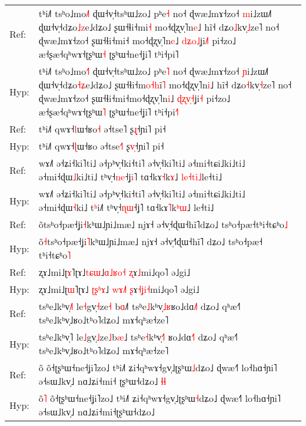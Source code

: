 \documentclass[10pt]{article}
\DeclareRobustCommand{\hl}[1]{{\textcolor{red}{#1}}}
\begin{document}
\begin{longtable}{ll}
\midrule 
Ref: & tʰi˩˥ tsʰo˩mo\hl{˩}˥ ɖɯ˧v̩˧tsʰɯ˩zo˩ pʰe\hl{˧} no˧ ɖwæ˩mɤ˧zo˧ \hl{m}i˩zɯ˩˥ ɖɯ˧v̩˧dʑo\hl{˩}\hl{z}e˩dʑo˩ ʂɯ˧ɬi˧mi\hl{˧} mo˧ɖʐv̩˥n\hl{e}˩ hĩ˧ dʑo\hl{˩}kv̩\hl{˩}ze˥ no˧ ɖwæ˩mɤ˧zo˧ ʂɯ˧ɬi˧mi˧\hl{ }mo˧ɖʐv̩˥n\hl{e}˩ \hl{d}\hl{ʑ}\hl{o}\hl{˩}ʝi\hl{˩}\hl{˥} pi˧zo˩ æ˧ʂæ˧qʰwɤ˧ʈʂʰɯ\hl{˧} ʈʂʰɯ˧ne˧ʝi˥ tʰi˧pi˥ \\ 
Hyp: & tʰi˩˥ tsʰo˩mo\hl{˧}˥ ɖɯ˧v̩˧tsʰɯ˩zo˩ pʰe\hl{˥} no˧ ɖwæ˩mɤ˧zo˧ \hl{ɲ}i˩zɯ˩˥ ɖɯ˧v̩˧dʑo\hl{˧}\hl{ʑ}e˩dʑo˩ ʂɯ˧ɬi˧m\hl{o}\hl{˧}\hl{h}i\hl{̃}\hl{˥} mo˧ɖʐv̩˥n\hl{i}˩ hĩ˧ dʑo\hl{˧}kv̩\hl{˧}ze˥ no˧ ɖwæ˩mɤ˧zo˧ ʂɯ˧ɬi˧mi˧mo˧ɖʐv̩˥n\hl{i}˩ \hl{ɖ}\hl{ʐ}\hl{v}\hl{̩}\hl{˧}ʝi\hl{˧} pi˧zo˩ æ˧ʂæ˧qʰwɤ˧ʈʂʰɯ\hl{˥} ʈʂʰɯ˧ne˧ʝi˥ tʰi˧pi\hl{˧}˥ \\ 
\midrule 
Ref: & tʰi˩˥ qwɤ˧\hl{l}ɯ˧ʁo\hl{˧} ə˧tse˥ ʂ\hl{ɻ}̩˧ɲi˥ pi˧ \\ 
Hyp: & tʰi˩˥ qwɤ˧\hl{ɭ}ɯ˧ʁo ə˧tse\hl{˧}˥ ʂ\hl{v}̩˧ɲi˥ pi˧ \\ 
\midrule 
Ref: & wɤ˩˥ ə˧ʑi˧ki˥ti˩ ə˧pʰv̩˧ki˧ti˥ ə˧v̩˧ki˥ti˩ ə˧mi˧tɕi˩ki˩ti˩ ə˧mi˧ɖɯ\hl{˩}ki˩ti˩ tʰv̩˧\hl{n}\hl{e}˧ʝ\hl{i}˥ tɑ˧kɤ\hl{˧}k\hl{ɤ}˩ \hl{l}\hl{e}\hl{˧}\hl{t}\hl{i}\hl{˩}le˧ti˩ \\ 
Hyp: & wɤ˩˥ ə˧ʑi˧ki˥ti˩ ə˧pʰv̩˧ki˧ti˥ ə˧v̩˧ki˥ti˩ ə˧mi˧tɕi˩ki˩ti˩ ə˧mi˧ɖɯ\hl{˧}ki˩\hl{ }t\hl{ʰ}i˩\hl{˥} tʰv̩˧\hl{ɳ}\hl{ɯ}˧ʝ˥ tɑ˧kɤ\hl{˥}k\hl{ʰ}\hl{ɯ}˩ le˧ti˩ \\ 
\midrule 
Ref: & õtsʰo˧pæ˧ʝi\hl{˧}kʰɯ˩ɲi˩mæ˩ njɤ˧ ə˧v̩˧ɖɯ˧hĩ˥dʑo˩ tsʰo˧pæ˧tʰi˧tɕʰo\hl{˩} \\ 
Hyp: & õ\hl{˧}tsʰo˧pæ˧ʝi\hl{˥}kʰɯ˩ɲi˩mæ˩ njɤ˧ ə˧v̩˧\hl{˥}ɖɯ˧hĩ˥\hl{ }dʑo˩ tsʰo˧pæ˧\hl{ }tʰi˧tɕʰo\hl{˥} \\ 
\midrule 
Ref: & ʐɤ˩mi˩ʈ\hl{ɤ}˥ʈɤ˩\hl{t}\hl{ɕ}\hl{ɯ}˩\hl{ɑ}\hl{˩}\hl{ʁ}\hl{o}\hl{˧} \hl{ʐ}ɤ\hl{˩}mi˩qo˥ ə˩gi˩\hl{ } \\ 
Hyp: & ʐɤ˩mi˩ʈ\hl{ɯ}˥ʈɤ˩\hl{ }\hl{ʈ}\hl{ʂ}\hl{ʰ}\hl{ɤ}˩\hl{ }\hl{w}\hl{ɤ}\hl{˩}\hl{˥} \hl{ʂ}ɤ\hl{˧}\hl{ʝ}\hl{i}\hl{˧}mi˩qo˥ ə˩gi˩ \\ 
\midrule 
Ref: & tsʰe˩kʰv̩\hl{˩}˥ le\hl{˧}gv̩\hl{˧}ze\hl{˧}\hl{ }b\hl{ɑ}˩\hl{˥} tsʰe\hl{˩}kʰv̩\hl{˩}\hl{ʁ}ʁo˩dɑ\hl{˩}˥ dʑo˩ qʰæ˧˥ tsʰe˩kʰv̩˩ʁo˩tʰo˥dʑo˩ mɤ˧qʰæ˧ze˥ \\ 
Hyp: & tsʰe˩kʰv̩˥ le\hl{˩}gv̩\hl{˩}ze\hl{˩}b\hl{æ}˩ tsʰe\hl{˧}kʰv̩\hl{˧}\hl{˥}\hl{ }ʁo˩dɑ\hl{˧}˥ dʑo˩ qʰæ˧˥ tsʰe˩kʰv̩˩ʁo˩tʰo˥dʑo˩ mɤ˧qʰæ˧ze˥ \\ 
\midrule 
Ref: & õ õ˧ʈʂʰɯ˧ne˧ʝi˥zo˩ tʰi˩˥ ʑi˧qʰwɤ˧gv̩˩ʈʂʰɯ\hl{˩}dʑo˩ ɖwæ˧˥ lo˧hɑ˧ɲi˥ ə˧sɯ˩kv̩˩ nɑ˩ʑi˧mi˧\hl{ }ʈʂʰɯ˧dʑo˩\hl{ }\hl{ɬ}\hl{ɬ} \\ 
Hyp: & õ\hl{˥} õ˧ʈʂʰɯ˧ne˧ʝi˥zo˩ tʰi˩˥ ʑi˧qʰwɤ˧gv̩˩ʈʂʰɯ\hl{˧}dʑo˩ ɖwæ˧˥ lo˧hɑ˧ɲi˥ ə˧sɯ˩kv̩˩ nɑ˩ʑi˧mi˧ʈʂʰɯ˧dʑo˩ \\ 

\end{longtable}
\end{document}
